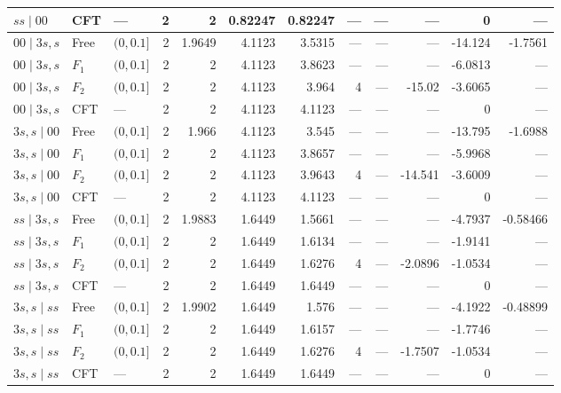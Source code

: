 \begin{longtable}{lllrrrrrrrrr}
$ss\mid 00$ & CFT & --- & 2 & 2 & 0.82247 & 0.82247 & --- & --- & --- & 0 & ---\\
\midrule
$00\mid 3s,s$ & Free & $(0,0.1]$ & 2 & 1.9649 & 4.1123 & 3.5315 & --- & --- & --- & -14.124 & -1.7561\\*
$00\mid 3s,s$ & $F_1$ & $(0,0.1]$ & 2 & 2 & 4.1123 & 3.8623 & --- & --- & --- & -6.0813 & ---\\*
$00\mid 3s,s$ & $F_2$ & $(0,0.1]$ & 2 & 2 & 4.1123 & 3.964 & 4 & --- & -15.02 & -3.6065 & ---\\*
$00\mid 3s,s$ & CFT & --- & 2 & 2 & 4.1123 & 4.1123 & --- & --- & --- & 0 & ---\\
\midrule
$3s,s\mid 00$ & Free & $(0,0.1]$ & 2 & 1.966 & 4.1123 & 3.545 & --- & --- & --- & -13.795 & -1.6988\\*
$3s,s\mid 00$ & $F_1$ & $(0,0.1]$ & 2 & 2 & 4.1123 & 3.8657 & --- & --- & --- & -5.9968 & ---\\*
$3s,s\mid 00$ & $F_2$ & $(0,0.1]$ & 2 & 2 & 4.1123 & 3.9643 & 4 & --- & -14.541 & -3.6009 & ---\\*
$3s,s\mid 00$ & CFT & --- & 2 & 2 & 4.1123 & 4.1123 & --- & --- & --- & 0 & ---\\
\midrule
$ss\mid 3s,s$ & Free & $(0,0.1]$ & 2 & 1.9883 & 1.6449 & 1.5661 & --- & --- & --- & -4.7937 & -0.58466\\*
$ss\mid 3s,s$ & $F_1$ & $(0,0.1]$ & 2 & 2 & 1.6449 & 1.6134 & --- & --- & --- & -1.9141 & ---\\*
$ss\mid 3s,s$ & $F_2$ & $(0,0.1]$ & 2 & 2 & 1.6449 & 1.6276 & 4 & --- & -2.0896 & -1.0534 & ---\\*
$ss\mid 3s,s$ & CFT & --- & 2 & 2 & 1.6449 & 1.6449 & --- & --- & --- & 0 & ---\\
\midrule
$3s,s\mid ss$ & Free & $(0,0.1]$ & 2 & 1.9902 & 1.6449 & 1.576 & --- & --- & --- & -4.1922 & -0.48899\\*
$3s,s\mid ss$ & $F_1$ & $(0,0.1]$ & 2 & 2 & 1.6449 & 1.6157 & --- & --- & --- & -1.7746 & ---\\*
$3s,s\mid ss$ & $F_2$ & $(0,0.1]$ & 2 & 2 & 1.6449 & 1.6276 & 4 & --- & -1.7507 & -1.0534 & ---\\*
$3s,s\mid ss$ & CFT & --- & 2 & 2 & 1.6449 & 1.6449 & --- & --- & --- & 0 & ---\\
\end{longtable}
\endgroup
